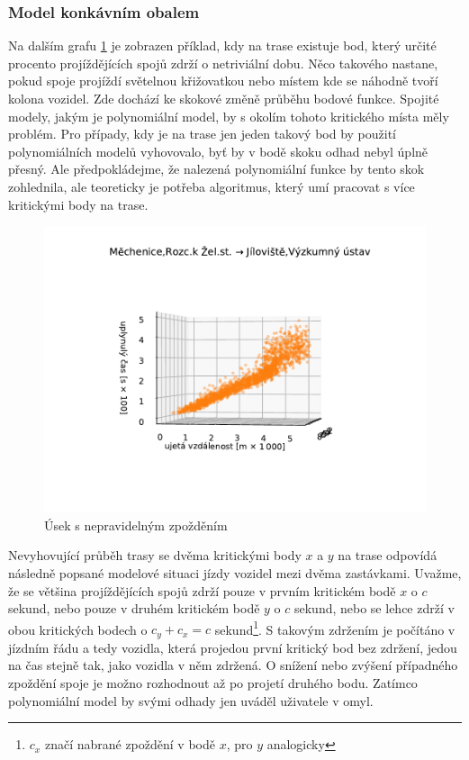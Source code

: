 \subsubsection{Model konkávním obalem}


Na dalším grafu \ref{fig:nepredvidatelne_zdrzeni} je zobrazen příklad, kdy na trase existuje bod, který určité procento projíždějících spojů zdrží o netriviální dobu. Něco takového nastane, pokud spoje projíždí světelnou křižovatkou nebo místem kde se náhodně tvoří kolona vozidel. Zde dochází ke skokové změně průběhu bodové funkce. Spojité modely, jakým je polynomiální model, by s okolím tohoto kritického místa měly problém. Pro případy, kdy je na trase jen jeden takový bod by použití polynomiálních modelů vyhovovalo, byť by v bodě skoku odhad nebyl úplně přesný. Ale předpokládejme, že nalezená polynomiální funkce by tento skok zohlednila, ale teoreticky je potřeba algoritmus, který umí pracovat s více kritickými body na trase.


\begin{figure}
\centering
  \includegraphics[width=\linewidth]{../img/1128_1129}
  \caption{Úsek s nepravidelným zpožděním}
  \label{fig:nepredvidatelne_zdrzeni}
\end{figure}


\bigbreak


Nevyhovující průběh trasy se dvěma kritickými body $x$ a $y$ na trase odpovídá následně popsané modelové situaci jízdy vozidel mezi dvěma zastávkami. Uvažme, že se většina projíždějících spojů zdrží pouze v prvním kritickém bodě $x$ o $c$ sekund, nebo pouze v druhém kritickém bodě $y$ o $c$ sekund, nebo se lehce zdrží v obou kritických bodech o $c_y + c_x = c$ sekund\footnote{$c_x$ značí nabrané zpoždění v bodě $x$, pro $y$ analogicky}. S takovým zdržením je počítáno v jízdním řádu a tedy vozidla, která projedou první kritický bod bez zdržení, jedou na čas stejně tak, jako vozidla v něm zdržená. O snížení nebo zvýšení případného zpoždění spoje je možno rozhodnout až po projetí druhého bodu. Zatímco polynomiální model by svými odhady jen uváděl uživatele v omyl.


